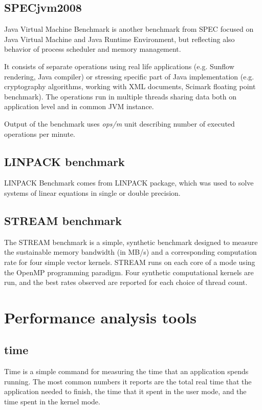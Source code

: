 \subsection{SPECjvm2008}
Java Virtual Machine Benchmark\;\cite{jvm2008} is another benchmark from SPEC
focused on Java Virtual Machine and Java Runtime Environment, but reflecting
also behavior of process scheduler and memory management.

It consists of separate operations using real life applications (e.g. Sunflow
rendering, Java compiler) or stressing specific part of Java implementation
(e.g. cryptography algorithms, working with XML documents, Scimark floating
point benchmark). The operations run in multiple threads sharing data both on
application level and in common JVM instance.

Output of the benchmark uses \emph{ops/m} unit describing number of executed
operations per minute.

\subsection{LINPACK benchmark}
LINPACK Benchmark\cite{linpack} comes from LINPACK package, which was used to solve systems of linear equations in single or double precision.

\subsection{STREAM benchmark}
The STREAM benchmark is a simple, synthetic benchmark designed to measure the sustainable memory bandwidth (in MB/s) and a corresponding computation rate for four simple vector kernels.
STREAM runs on each core of a mode using the OpenMP programming paradigm. Four synthetic computational kernels are run, and the best rates observed are reported for each choice of thread count.

\section{Performance analysis tools}

\subsection{time}
Time is a simple command for measuring the time that an application spends
running. The most common numbers it reports are the total real time that the
application needed to finish, the time that it spent in the user mode, and the
time spent in the kernel mode.


